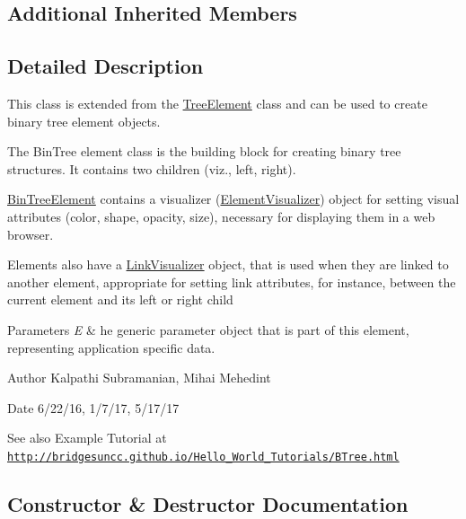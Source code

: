 \subsection*{Additional Inherited Members}


\subsection{Detailed Description}
This class is extended from the \mbox{\hyperlink{classbridges_1_1base_1_1_tree_element}{Tree\+Element}} class and can be used to create binary tree element objects. 

The Bin\+Tree element class is the building block for creating binary tree structures. It contains two children (viz., left, right).

\mbox{\hyperlink{classbridges_1_1base_1_1_bin_tree_element}{Bin\+Tree\+Element}} contains a visualizer (\mbox{\hyperlink{classbridges_1_1base_1_1_element_visualizer}{Element\+Visualizer}}) object for setting visual attributes (color, shape, opacity, size), necessary for displaying them in a web browser.

Elements also have a \mbox{\hyperlink{classbridges_1_1base_1_1_link_visualizer}{Link\+Visualizer}} object, that is used when they are linked to another element, appropriate for setting link attributes, for instance, between the current element and its left or right child


\begin{DoxyParams}{Parameters}
{\em E} & he generic parameter object that is part of this element, representing application specific data.\\
\hline
\end{DoxyParams}
\begin{DoxyAuthor}{Author}
Kalpathi Subramanian, Mihai Mehedint
\end{DoxyAuthor}
\begin{DoxyDate}{Date}
6/22/16, 1/7/17, 5/17/17
\end{DoxyDate}
\begin{DoxySeeAlso}{See also}
Example Tutorial at ~\newline
 \href{http://bridgesuncc.github.io/Hello_World_Tutorials/BTree.html}{\tt http\+://bridgesuncc.\+github.\+io/\+Hello\+\_\+\+World\+\_\+\+Tutorials/\+B\+Tree.\+html} 
\end{DoxySeeAlso}


\subsection{Constructor \& Destructor Documentation}
\mbox{\label{classbridges_1_1base_1_1_bin_tree_element_ad6dbf38d53a78be561039c46bde8bc47}} 
